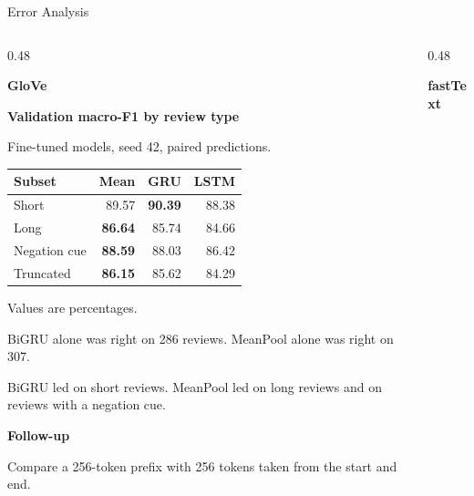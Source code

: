 \begin{frame}[t]{Error Analysis}
\begin{columns}[T,onlytextwidth]
\begin{column}{0.48\textwidth}
\raggedright\footnotesize
\textbf{GloVe}\par\smallskip
\textbf{Validation macro-F1 by review type}\par
Fine-tuned models, seed 42, paired predictions.

\smallskip
{\scriptsize
\begin{tabular*}{\linewidth}{@{\extracolsep{\fill}}lrrr@{}}
\hline
Subset & Mean & GRU & LSTM \\
\hline
Short & 89.57 & \textbf{90.39} & 88.38 \\
Long & \textbf{86.64} & 85.74 & 84.66 \\
Negation cue & \textbf{88.59} & 88.03 & 86.42 \\
Truncated & \textbf{86.15} & 85.62 & 84.29 \\
\hline
\end{tabular*}\par
Values are percentages.\par}

\smallskip
BiGRU alone was right on 286 reviews. MeanPool alone was right on 307.

\smallskip
BiGRU led on short reviews. MeanPool led on long reviews and on reviews with a negation cue.

\smallskip
\textbf{Follow-up}\par
Compare a 256-token prefix with 256 tokens taken from the start and end.
\end{column}
\begin{column}{0.48\textwidth}
\raggedright\footnotesize\textbf{fastText}\par
\end{column}
\end{columns}
\end{frame}
